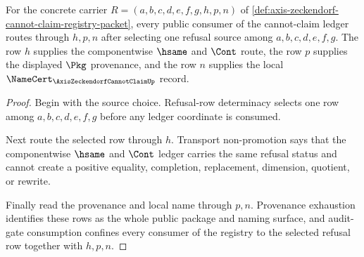\begin{theorem}
\label{thm:axis-zeckendorf-cannot-claim-ledger-consumer-exactness}
For the concrete carrier $R=(a,b,c,d,e,f,g,h,p,n)$ of \autoref{def:axis-zeckendorf-cannot-claim-registry-packet}, every public consumer of the cannot-claim ledger routes through $h,p,n$ after selecting one refusal source among $a,b,c,d,e,f,g$. The row $h$ supplies the componentwise $\hsame$ and $\Cont$ route, the row $p$ supplies the displayed $\Pkg$ provenance, and the row $n$ supplies the local $\NameCert_{\AxisZeckendorfCannotClaimUp}$ record.
\end{theorem}
\begin{proof}
Begin with the source choice. Refusal-row determinacy selects one row among $a,b,c,d,e,f,g$ before any ledger coordinate is consumed.

Next route the selected row through $h$. Transport non-promotion says that the componentwise $\hsame$ and $\Cont$ ledger carries the same refusal status and cannot create a positive equality, completion, replacement, dimension, quotient, or rewrite.

Finally read the provenance and local name through $p,n$. Provenance exhaustion identifies these rows as the whole public package and naming surface, and audit-gate consumption confines every consumer of the registry to the selected refusal row together with $h,p,n$.
\end{proof}

